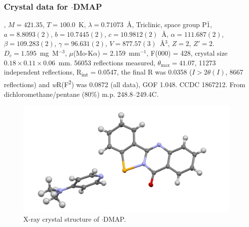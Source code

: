 \begin{refsection}
    \subsubsection{Crystal data for \texorpdfstring{$ \cdot $DMAP}{C21H18N4OSe}}
    , $M = 421.35$, $T=100.0$~K, $ \lambda=0.71073 $~\AA, Triclinic, space group P$\bar{1}$, $a = 8.8093(2)$, $b = 10.7445(2)$, $c = 10.9812(2)$~\AA, $\alpha = 111.687(2)$\degree, $\beta = 109.283(2)$\degree, $\gamma = 96.631(2)$\degree, $V = 877.57(3)$~\AA$^{3}$, $Z = 2$, $Z\prime = 2$.
    $D_{c}= 1.595$~mg~M$^{-3}$, $\mu$(Mo-K$\alpha$) = 2.159~mm$^{-1}$, F(000) = 428, crystal size $0.18 \times 0.11 \times 0.06$~mm.
    56053 reflections measured, $\theta_{\max} = 41.07$\degree, 11273 independent reflections, R\textsubscript{int} = 0.0547, the final R was 0.0358 ($I > 2\theta(I)$, 8667 reflections) and \textit{w}R(F\textsuperscript{2}) was 0.0872 (all data), GOF 1.048.
    CCDC 1867212.
    From dichloromethane/pentane (80\%) m.p. 248.8--249.4\degree{}C.
    
    \begin{figure}
      \includegraphics[width=0.6\linewidth]{Figures/tetracycle-dmap-xtal.pdf}
      \caption{X-ray crystal structure of \texorpdfstring{$ \cdot $DMAP}{C21H18N4OSe}.}
    \end{figure}
    
    \printbibliography[heading=subbibliography]
    \end{refsection}
    